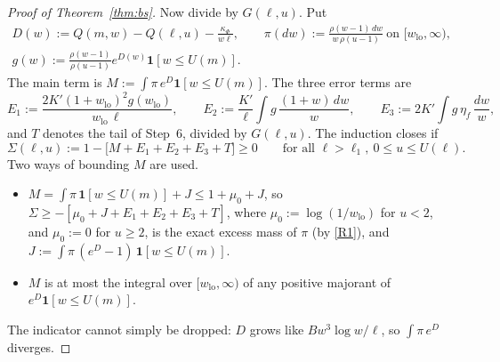 \begin{proof}[Proof of Theorem~\ref{thm:bs}]
Now divide by $G(\ell,u)$. Put
\begin{gather*}
  D(w):=Q(m,w)-Q(\ell,u)-\frac{\kappa_\Phi}{w\ell},\qquad
  \pi(dw):=\frac{\rho(w-1)\,dw}{w\,\rho(u-1)}\ \text{on }[w_{\mathrm{lo}},\infty),\\
  g(w):=\frac{\rho(w-1)}{\rho(u-1)}e^{D(w)}\mathbf 1[w\le U(m)] .
\end{gather*}
The main term is $M:=\int\pi\,e^D\mathbf 1[w\le U(m)]$. The three error terms are
\[
  E_1:=\frac{2K'(1+w_{\mathrm{lo}})^2g(w_{\mathrm{lo}})}{w_{\mathrm{lo}}\,\ell},\qquad
  E_2:=\frac{K'}\ell\int g\,\frac{(1+w)\,dw}w,\qquad E_3:=2K'\int g\,\eta_f\,\frac{dw}w ,
\]
and $T$ denotes the tail of Step~6, divided by $G(\ell,u)$. The induction closes if
\begin{equation}\label{eq:bs-Sigma}
  \Sigma(\ell,u):=1-\big[M+E_1+E_2+E_3+T\big]\ge0\qquad\text{for all }\ell>\ell_1,\ 0\le u\le U(\ell).
\end{equation}
Two ways of bounding $M$ are used.
\begin{itemize}
\item $M=\int\pi\,\mathbf 1[w\le U(m)]+J\le1+\mu_0+J$, so $\Sigma\ge-[\mu_0+J+E_1+E_2+E_3+T]$, where
  $\mu_0:=\log(1/w_{\mathrm{lo}})$ for $u<2$, and $\mu_0:=0$ for $u\ge2$, is the exact excess mass of $\pi$ (by \ref{R1}), and
  $J:=\int\pi\,(e^D-1)\,\mathbf 1[w\le U(m)]$.
\item $M$ is at most the integral over $[w_{\mathrm{lo}},\infty)$ of any positive majorant of $e^D\mathbf 1[w\le U(m)]$.
\end{itemize}
The indicator cannot simply be dropped: $D$ grows like $Bw^3\log w/\ell$, so $\int\pi\,e^D$ diverges.


\end{proof}
